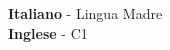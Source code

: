 \documentclass[10pt]{developercv} %
\begin{document}




\textbf{Italiano} - Lingua Madre\\
\textbf{Inglese} - C1


	
	
	
\end{document}
